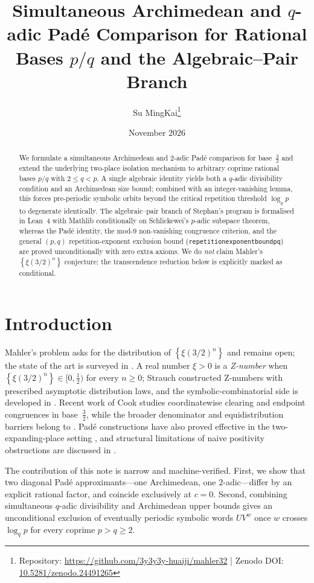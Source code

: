 \documentclass[11pt,a4paper]{article}
\title{Simultaneous Archimedean and \texorpdfstring{$q$}{q}-adic Pad\'e Comparison for Rational Bases \texorpdfstring{$p/q$}{p/q} and the Algebraic--Pair Branch}
\author{Su MingKai\thanks{Repository: \url{https://github.com/3y3y3y-huaiji/mahler32} \;|\; Zenodo DOI: \href{https://doi.org/10.5281/zenodo.24491265}{10.5281/zenodo.24491265}}}
\date{November 2026}
\theoremstyle{remark}
\newcommand{\fract}[1]{\left\{#1\right\}}
\renewcommand{\_}{\textunderscore\allowbreak}
\newcommand{\lean}[1]{\texttt{#1}}
\begin{document}
\maketitle

\begin{abstract}
We formulate a simultaneous Archimedean and $2$-adic Pad\'e comparison for base~$\tfrac32$ and extend the underlying two-place isolation mechanism to arbitrary coprime rational bases $p/q$ with $2\le q<p$. A single algebraic identity yields both a $q$-adic divisibility condition and an Archimedean size bound; combined with an integer-vanishing lemma, this forces pre-periodic symbolic orbits beyond the critical repetition threshold $\log_q p$ to degenerate identically. The algebraic--pair branch of Stephan's program is formalised in Lean~4 with Mathlib conditionally on Schlickewei's $p$-adic subspace theorem, whereas the Pad\'e identity, the mod-$9$ non-vanishing congruence criterion, and the general $(p,q)$ repetition-exponent exclusion bound (\lean{repetition\_exponent\_bound\_pq}) are proved unconditionally with zero extra axioms. We do \emph{not} claim Mahler's $\fract{\xi(3/2)^n}$ conjecture; the transcendence reduction below is explicitly marked as conditional.
\end{abstract}

\tableofcontents

\section{Introduction}

Mahler's problem asks for the distribution of $\fract{\xi(3/2)^n}$ and remains open; the state of the art is surveyed in \citep{stephan2026subspace,stephan2026minimal,stephan2026third}. A real number $\xi>0$ is a \emph{Z-number} when $\fract{\xi(3/2)^n}\in[0,\tfrac12)$ for every $n\ge0$; Strauch \citep{strauch1997} constructed Z-numbers with prescribed asymptotic distribution laws, and the symbolic-combinatorial side is developed in \citep{lagarias2003,andrieu2026,cassaigne2026}. Recent work of Cook \citep{cook2026} studies coordinatewise clearing and endpoint congruences in base~$\tfrac32$, while the broader denominator and equidistribution barriers belong to \citep{calegari2025,elmv}. Pad\'e constructions have also proved effective in the two-expanding-place setting \citep{dedeo2026}, and structural limitations of naive positivity obstructions are discussed in \citep{tao2026}.

The contribution of this note is narrow and machine-verified. First, we show that two diagonal Pad\'e approximants---one Archimedean, one $2$-adic---differ by an explicit rational factor, and coincide exclusively at $c=0$. Second, combining simultaneous $q$-adic divisibility and Archimedean upper bounds gives an unconditional exclusion of eventually periodic symbolic words $U V^w$ once $w$ crosses $\log_q p$ for every coprime $p>q\ge2$.
\end{document}
